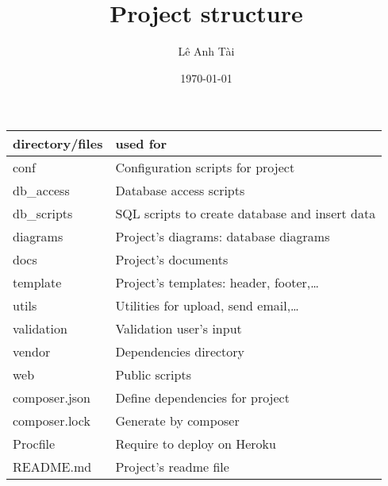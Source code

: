 \documentclass[11pt]{article}
\author{Lê Anh Tài}
\date{\today}
\title{Project structure}
\begin{document}
\maketitle
\tableofcontents

\begin{center}
\begin{tabular}{ll}
directory/files & used for\\
\hline
conf & Configuration scripts for project\\
db\_access & Database access scripts\\
db\_scripts & SQL scripts to create database and insert data\\
diagrams & Project's diagrams: database diagrams\\
docs & Project's documents\\
template & Project's templates: header, footer,\ldots{}\\
utils & Utilities for upload, send email,\ldots{}\\
validation & Validation user's input\\
vendor & Dependencies directory\\
web & Public scripts\\
composer.json & Define dependencies for project\\
composer.lock & Generate by composer\\
Procfile & Require to deploy on Heroku\\
README.md & Project's readme file\\
\end{tabular}
\end{center}
\end{document}
